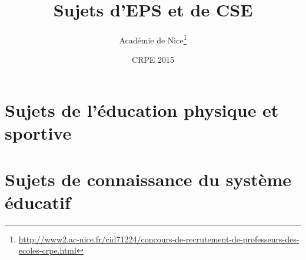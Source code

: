 \documentclass[a4paper]{article}
\title{Sujets d’EPS et de CSE}
\author{Académie de Nice\thanks{\url{http://www2.ac-nice.fr/cid71224/concours-de-recrutement-de-professeurs-des-ecoles-crpe.html}}}
\date{CRPE 2015}
\begin{document}
\maketitle
\thispagestyle{empty}



\section{Sujets de l’éducation physique et sportive}


\section{Sujets de connaissance du système éducatif}


\tableofcontents
\end{document}
